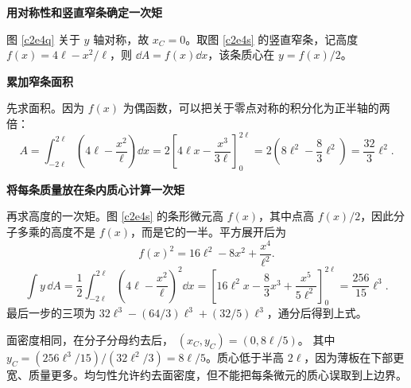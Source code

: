 \begin{solution}\textbf{用对称性和竖直窄条确定一次矩}\par\nobreak
\par\medskip{}\noindent\nobreak
图 \ref{c2e4q} 关于 $y$ 轴对称，故 $x_C=0$。取图 \ref{c2e4s} 的竖直窄条，记高度 $f(x)=4\ell-x^2/\ell$，则 $\dd A=f(x)\dd x$，该条质心在 $y=f(x)/2$。



\par\medskip{}\noindent\nobreak


\par\medskip{}\noindent\textbf{累加窄条面积}\par\nobreak
先求面积。因为 $f(x)$ 为偶函数，可以把关于零点对称的积分化为正半轴的两倍：
\[
 A=\int_{-2\ell}^{2\ell}\left(4\ell-\frac{x^2}{\ell}\right)\dd x
 =2\left[4\ell x-\frac{x^3}{3\ell}\right]_0^{2\ell}
 =2\left(8\ell^2-\frac83\ell^2\right)
 =\frac{32}3\ell^2.
\]


\par\medskip{}\noindent\textbf{将每条质量放在条内质心计算一次矩}\par\nobreak
再求高度的一次矩。图 \ref{c2e4s} 的条形微元高 $f(x)$，其中点高 $f(x)/2$，因此分子多乘的高度不是 $f(x)$，而是它的一半。平方展开后为
\[
 f(x)^2=16\ell^2-8x^2+\frac{x^4}{\ell^2}.
\]
\[
 \int y\,\dd A=\frac12\int_{-2\ell}^{2\ell}
 \left(4\ell-\frac{x^2}{\ell}\right)^2\dd x
 =\left[16\ell^2x-\frac83x^3+\frac{x^5}{5\ell^2}\right]_0^{2\ell}
 =\frac{256}{15}\ell^3.
\]
最后一步的三项为 $32\ell^3-(64/3)\ell^3+(32/5)\ell^3$，通分后得到上式。

面密度相同，在分子分母约去后，
$\boxed{(x_C,y_C)=(0,8\ell/5)}$。
其中 $y_C=(256\ell^3/15)/(32\ell^2/3)=8\ell/5$。质心低于半高 $2\ell$，因为薄板在下部更宽、质量更多。均匀性允许约去面密度，但不能把每条微元的质心误取到上边界。




\end{solution}
